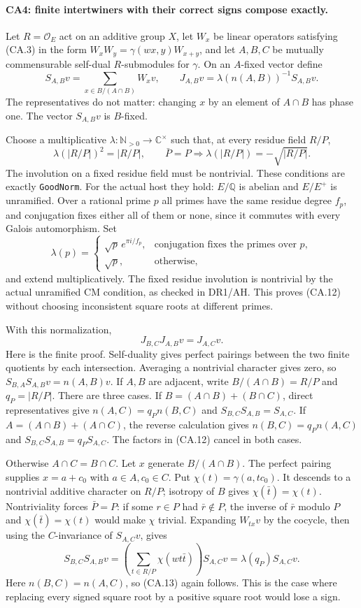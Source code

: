 \paragraph{CA4: finite intertwiners with their correct signs compose exactly.}
Let $R=\mathcal O_E$ act on an additive group $X$, let $W_x$ be
linear operators satisfying (CA.3) in the form
$W_xW_y=\gamma(wx,y)W_{x+y}$, and let $A,B,C$ be mutually
commensurable self-dual $R$-submodules for $\gamma$. On an $A$-fixed
vector define
\[
 S_{A,B}v=\sum_{x\in B/(A\cap B)}W_xv,\qquad
 J_{A,B}v=\lambda(n(A,B))^{-1}S_{A,B}v.
 \tag{CA.11}
\]
The representatives do not matter: changing $x$ by an element of
$A\cap B$ has phase one. The vector $S_{A,B}v$ is $B$-fixed.

Choose a multiplicative $\lambda:\mathbb N_{>0}\to\mathbb C^\times$
such that, at every residue field $R/P$,
\[
 \lambda(|R/P|)^2=|R/P|,
 \qquad \bar P=P\Longrightarrow
              \lambda(|R/P|)=-\sqrt{|R/P|}.
 \tag{CA.12}
\]
The involution on a fixed residue field must be nontrivial. These
conditions are exactly \texttt{GoodNorm}. For the actual host they
hold: $E/\mathbb Q$ is abelian and $E/E^+$ is unramified. Over a
rational prime $p$ all primes have the same residue degree $f_p$,
and conjugation fixes either all of them or none, since it commutes
with every Galois automorphism. Set
\[
 \lambda(p)=\begin{cases}
 \sqrt p\,e^{\pi i/f_p},&\text{conjugation fixes the primes over }p,\\
 \sqrt p,&\text{otherwise},
 \end{cases}
\]
and extend multiplicatively. The fixed residue involution is
nontrivial by the actual unramified CM condition, as checked in
DR1/AH. This proves (CA.12) without choosing inconsistent square
roots at different primes.

With this normalization,
\[
 J_{B,C}J_{A,B}v=J_{A,C}v.
 \tag{CA.13}
\]
Here is the finite proof. Self-duality gives perfect pairings between
the two finite quotients by each intersection. Averaging a nontrivial
character gives zero, so
$S_{B,A}S_{A,B}v=n(A,B)v$. If $A,B$ are adjacent, write
$B/(A\cap B)=R/P$ and $q_P=|R/P|$. There are three cases.
If $B=(A\cap B)+(B\cap C)$, direct representatives give
$n(A,C)=q_Pn(B,C)$ and $S_{B,C}S_{A,B}=S_{A,C}$.
If $A=(A\cap B)+(A\cap C)$, the reverse calculation gives
$n(B,C)=q_Pn(A,C)$ and $S_{B,C}S_{A,B}=q_PS_{A,C}$.
The factors in (CA.12) cancel in both cases.

Otherwise $A\cap C=B\cap C$. Let $x$ generate
$B/(A\cap B)$. The perfect pairing supplies $x=a+c_0$ with
$a\in A,c_0\in C$. Put $\chi(t)=\gamma(a,tc_0)$. It descends to
a nontrivial additive character on $R/P$; isotropy of $B$ gives
$\chi(\bar t)=\chi(t)$. Nontriviality forces $\bar P=P$:
if some $r\in P$ had $\bar r\notin P$, the inverse of $\bar r$
modulo $P$ and $\chi(\bar t)=\chi(t)$ would make $\chi$ trivial.
Expanding $W_{tx}v$ by the cocycle, then using the $C$-invariance of
$S_{A,C}v$, gives
\[
 S_{B,C}S_{A,B}v
   =\left(\sum_{t\in R/P}\chi(wt\bar t)\right)S_{A,C}v
   =\lambda(q_P)S_{A,C}v.
\]
Here $n(B,C)=n(A,C)$, so (CA.13) again follows. This is the case
where replacing every signed square root by a positive square root
would lose a sign.

